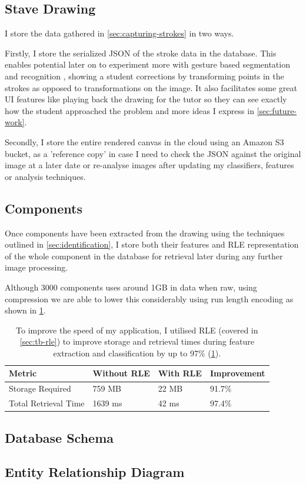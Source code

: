 \subsection{Stave Drawing}
I store the data gathered in \cref{sec:capturing-strokes} in two ways.

Firstly, I store the serialized JSON of the stroke data in the database. This enables potential later on to experiment more with gesture based segmentation and recognition , showing a student corrections by transforming points in the strokes as opposed to transformations on the image. It also facilitates some great UI features like playing back the drawing for the tutor so they can see exactly how the student approached the problem and more ideas I express in \cref{sec:future-work}.

Secondly, I store the entire rendered canvas in the cloud using an Amazon S3 bucket, as a 'reference copy' in case I need to check the JSON against the original image at a later date or re-analyse images after updating my classifiers, features or analysis techniques.


\subsection{Components}

Once components have been extracted from the drawing using the techniques outlined in \cref{sec:identification}, I store both their features and \acrfull{RLE} representation of the whole component in the database for retrieval later during any further image processing.

Although 3000 components uses around 1GB in data when raw, using compression we are able to lower this considerably using run length encoding as shown in \ref{table:rle-improvement}.

\begin{table}[H]

    \begin{tabularx}{\textwidth}{ X X X X }
    \toprule
    Metric                  & Without RLE   & With RLE   & Improvement \\
    \midrule
    Storage Required        & 759 MB        & 22 MB      & 91.7\%      \\
    Total Retrieval Time    & 1639 ms       & 42 ms      & 97.4\% \\
    \bottomrule
    \end{tabularx}

    \caption{To improve the speed of my application, I utilised \acrfull{RLE} (covered in \cref{sec:tb-rle}) to improve storage and retrieval times during feature extraction and classification by up to 97\% (\cref{table:rle-improvement}).}
    \label{table:rle-improvement}
\end{table}

\subsection{Database Schema}

\subsection{Entity Relationship Diagram}





